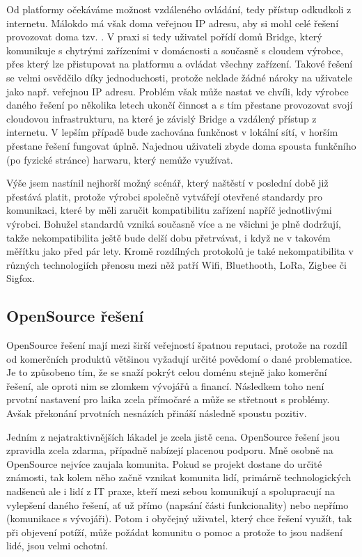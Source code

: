 Od platformy očekáváme možnost vzdáleného ovládání, tedy přístup odkudkoli z internetu. Málokdo má však doma veřejnou IP adresu, aby si mohl celé řešení provozovat doma tzv. . V praxi si tedy uživatel pořídí domů Bridge, který komunikuje s chytrými zařízeními v domácnosti a současně s cloudem výrobce, přes který lze přistupovat na platformu a ovládat všechny zařízení. Takové řešení se velmi osvědčilo díky jednoduchosti, protože neklade žádné nároky na uživatele jako např. veřejnou IP adresu. Problém však může nastat ve chvíli, kdy výrobce daného řešení po několika letech ukončí činnost a s tím přestane provozovat svojí cloudovou infrastrukturu, na které je závislý Bridge a vzdálený přístup z internetu. V lepším případě bude zachována funkčnost v lokální sítí, v horším přestane řešení fungovat úplně. Najednou uživateli zbyde doma spousta funkčního (po fyzické stránce) harwaru, který nemůže využívat.

Výše jsem nastínil nejhorší možný scénář, který naštěstí v poslední době již přestává platit, protože výrobci společně vytvářejí otevřené standardy pro komunikaci, které by měli zaručit kompatibilitu zařízení napříč jednotlivými výrobci. Bohužel standardů vzniká současně více a ne všichni je plně dodržují, takže nekompatibilita ještě bude delší dobu přetrvávat, i když ne v takovém měřítku jako před pár lety. Kromě rozdílných protokolů je také nekompatibilita v různých technologiích přenosu mezi něž patří Wifi, Bluethooth, LoRa, Zigbee či Sigfox.

\subsection{OpenSource řešení}
OpenSource řešení mají mezi širší veřejností špatnou reputaci, protože na rozdíl od komerčních  produktů většinou vyžadují určité povědomí o dané problematice. Je to způsobeno tím, že se snaží pokrýt celou doménu stejně jako komerční řešení, ale oproti nim se zlomkem vývojářů a financí. Následkem toho není prvotní nastavení pro laika zcela přímočaré a může se střetnout s problémy. Avšak překonání prvotních nesnázích přináší následně spoustu pozitiv.

Jedním z nejatraktivnějších lákadel je zcela jistě cena. OpenSource řešení jsou zpravidla zcela zdarma, případně nabízejí placenou podporu. Mně osobně na OpenSource nejvíce zaujala komunita. Pokud se projekt dostane do určité známosti, tak kolem něho začně vznikat komunita lidí, primárně technologických nadšenců ale i lidí z IT praxe, kteří mezi sebou komunikují a spolupracují na vylepšení daného řešení, ať už přímo (napsání části funkcionality) nebo nepřímo (komunikace s vývojáři). Potom i obyčejný uživatel, který chce řešení využít, tak při objevení potíží, může požádat komunitu o pomoc a protože to jsou nadšení lidé, jsou velmi ochotní.

